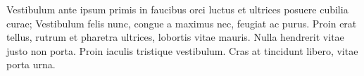Vestibulum ante ipsum primis in faucibus orci luctus et ultrices posuere cubilia curae; Vestibulum felis nunc, congue a maximus nec, feugiat ac purus. Proin erat tellus, rutrum et pharetra ultrices, lobortis vitae mauris. Nulla hendrerit vitae justo non porta. Proin iaculis tristique vestibulum. Cras at tincidunt libero, vitae porta urna. 
